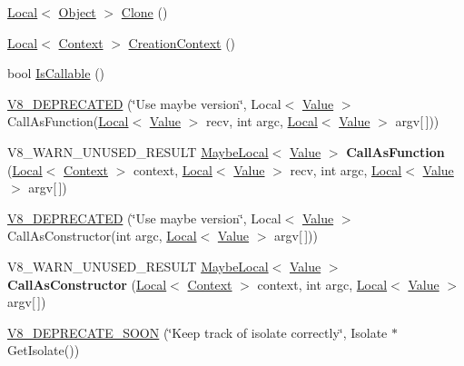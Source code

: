 \begin{DoxyCompactItemize}
\item 
\hyperlink{classv8_1_1Local}{Local}$<$ \hyperlink{classv8_1_1Object}{Object} $>$ \hyperlink{classv8_1_1Object_a5018c9d085aa71f65530cf1e073a04ad}{Clone} ()
\item 
\hyperlink{classv8_1_1Local}{Local}$<$ \hyperlink{classv8_1_1Context}{Context} $>$ \hyperlink{classv8_1_1Object_af6966283a7d7e20779961eed434db04d}{Creation\+Context} ()
\item 
bool \hyperlink{classv8_1_1Object_a23c2c1f23b50fab4a02e2f819641b865}{Is\+Callable} ()
\item 
\hyperlink{classv8_1_1Object_a804b075e3562005ad8d0e2970ce9cf1a}{V8\+\_\+\+D\+E\+P\+R\+E\+C\+A\+T\+ED} (\char`\"{}Use maybe version\char`\"{}, Local$<$ \hyperlink{classv8_1_1Value}{Value} $>$ Call\+As\+Function(\hyperlink{classv8_1_1Local}{Local}$<$ \hyperlink{classv8_1_1Value}{Value} $>$ recv, int argc,                                                                                                                                                                       \hyperlink{classv8_1_1Local}{Local}$<$ \hyperlink{classv8_1_1Value}{Value} $>$ argv\mbox{[}$\,$\mbox{]}))
\item 
V8\+\_\+\+W\+A\+R\+N\+\_\+\+U\+N\+U\+S\+E\+D\+\_\+\+R\+E\+S\+U\+LT \hyperlink{classv8_1_1MaybeLocal}{Maybe\+Local}$<$ \hyperlink{classv8_1_1Value}{Value} $>$ {\bfseries Call\+As\+Function} (\hyperlink{classv8_1_1Local}{Local}$<$ \hyperlink{classv8_1_1Context}{Context} $>$ context, \hyperlink{classv8_1_1Local}{Local}$<$ \hyperlink{classv8_1_1Value}{Value} $>$ recv, int argc, \hyperlink{classv8_1_1Local}{Local}$<$ \hyperlink{classv8_1_1Value}{Value} $>$ argv\mbox{[}$\,$\mbox{]})\hypertarget{classv8_1_1Object_aec7375fe34a800baac4e26deb33ccac0}{}\label{classv8_1_1Object_aec7375fe34a800baac4e26deb33ccac0}

\item 
\hyperlink{classv8_1_1Object_a0ce5417b42d5bfb5a8dc3482dcb733eb}{V8\+\_\+\+D\+E\+P\+R\+E\+C\+A\+T\+ED} (\char`\"{}Use maybe version\char`\"{}, Local$<$ \hyperlink{classv8_1_1Value}{Value} $>$ Call\+As\+Constructor(int argc, \hyperlink{classv8_1_1Local}{Local}$<$ \hyperlink{classv8_1_1Value}{Value} $>$ argv\mbox{[}$\,$\mbox{]}))
\item 
V8\+\_\+\+W\+A\+R\+N\+\_\+\+U\+N\+U\+S\+E\+D\+\_\+\+R\+E\+S\+U\+LT \hyperlink{classv8_1_1MaybeLocal}{Maybe\+Local}$<$ \hyperlink{classv8_1_1Value}{Value} $>$ {\bfseries Call\+As\+Constructor} (\hyperlink{classv8_1_1Local}{Local}$<$ \hyperlink{classv8_1_1Context}{Context} $>$ context, int argc, \hyperlink{classv8_1_1Local}{Local}$<$ \hyperlink{classv8_1_1Value}{Value} $>$ argv\mbox{[}$\,$\mbox{]})\hypertarget{classv8_1_1Object_a10dcefb0bd595a959234703690a02530}{}\label{classv8_1_1Object_a10dcefb0bd595a959234703690a02530}

\item 
\hyperlink{classv8_1_1Object_a5e7199a517d980396bb86f876b5bae0a}{V8\+\_\+\+D\+E\+P\+R\+E\+C\+A\+T\+E\+\_\+\+S\+O\+ON} (\char`\"{}Keep track of isolate correctly\char`\"{}, Isolate $\ast$Get\+Isolate())
\end{DoxyCompactItemize}
